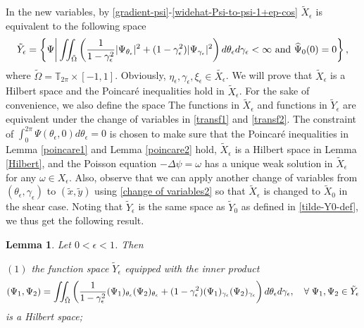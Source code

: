 \documentclass[1 [leqno, 11pt]{amsart}
\numberwithin{equation}{section}
\let\ep=\epsilon
\newtheorem{lemma}[Theorem]{Lemma}
\begin{document}
\begin{CJK*}{GBK}{song}
In  the new variables, by \eqref{gradient-psi}-\eqref{widehat-Psi-to-psi-1+ep-cos} $\tilde{X}_\ep$ is equivalent  to the following space
\begin{align*}
\tilde{Y}_\ep = \left\{ \Psi \bigg| \iint_{\tilde \Omega}\left({1\over1-\gamma_\ep^2}|\Psi_{\theta_\ep}|^2+(1-\gamma_\ep^2)|\Psi_{\gamma_\ep}|^2\right)d \theta_\ep d\gamma_\ep< \infty \text{ and } \widehat{\Psi}_0(0)=0 \right\},
\end{align*}
where $\tilde \Omega = \mathbb{T}_{2\pi} \times [-1, 1]$.
Obviously, $\eta_\ep, \gamma_\ep, \xi_\ep \in \tilde{X_\ep}$. We will prove that $\tilde{X}_\ep$ is a Hilbert space and the Poincar\'e inequalities hold in $\tilde{X}_\ep$. For the sake of convenience, we also define the space
The functions in $\tilde{X}_\ep$ and functions in $\tilde{Y}_\ep$ are equivalent under the change of variables in \eqref{transf1} and \eqref{transf2}. The constraint of $\int_{0}^{2\pi}\Psi(\theta_\ep, 0)d\theta_\ep = 0$ is chosen to make sure that the Poincar\'e inequalities in Lemma \ref{poincare1} and Lemma \ref{poincare2} hold, $\tilde{X}_\ep$ is a Hilbert space in Lemma \ref{Hilbert}, and the Poisson equation $-\Delta \psi = \omega$ has a unique weak solution in $\tilde{X}_\ep$ for any $\omega \in X_\ep$. Also, observe that we can apply another change of variables from $(\theta_\ep, \gamma_\ep)$ to $(\tilde{x}, \tilde{y})$ using \eqref{change of variables2} so that $\tilde{X}_\ep$ is changed to $\tilde{X}_0$ in the shear case.
\fi
Noting that $\tilde{Y}_\ep$ is the same space as $\tilde Y_0$ as defined in \eqref{tilde-Y0-def}, we thus get the following result.



\begin{lemma}\label{hilbert-ep}
Let $0<\epsilon<1$. Then

$(1)$ the function space $\tilde{Y}_\ep$ equipped with the inner product
 $$(\Psi_1, \Psi_2) = \iint_{\tilde{\Omega}}  \left({1\over1-\gamma_\ep^2}(\Psi_1)_{\theta_\ep}(\Psi_2)_{\theta_\ep} +(1-\gamma_\ep^2)(\Psi_1)_{\gamma_\ep}(\Psi_2)_{\gamma_\ep}\right)d \theta_\ep d\gamma_\ep, \quad \forall\; \Psi_1, \Psi_2 \in \tilde{Y}_\ep$$
 is  a Hilbert space;


\end{lemma}
\end{CJK*}
\end{document}
